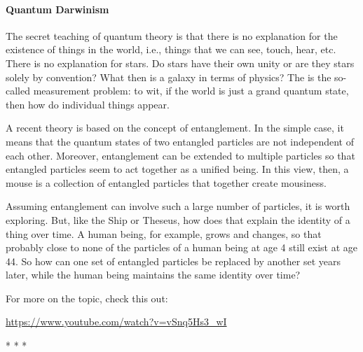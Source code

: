 \paragraph{Quantum Darwinism}


The secret teaching of quantum theory is that there is no explanation for the existence of things in the world, i.e., things that we can see, touch, hear, etc. There is no explanation for stars. Do stars have their own unity or are they stars solely by convention? What then is a galaxy in terms of physics? The is the so-called measurement problem: to wit, if the world is just a grand quantum state, then how do individual things appear.

A recent theory is based on the concept of entanglement. In the simple case, it means that the quantum states of two entangled particles are not independent of each other. Moreover, entanglement can be extended to multiple particles so that entangled particles seem to act together as a unified being. In this view, then, a mouse is a collection of entangled particles that together create mousiness.

Assuming entanglement can involve such a large number of particles, it is worth exploring. But, like the Ship or Theseus, how does that explain the identity of a thing over time. A human being, for example, grows and changes, so that probably close to none of the particles of a human being at age 4 still exist at age 44. So how can one set of entangled particles be replaced by another set years later, while the human being maintains the same identity over time?

For more on the topic, check this out:

\url{https://www.youtube.com/watch?v=vSnq5Hs3\_wI}


\begin{center}* * *\end{center}

